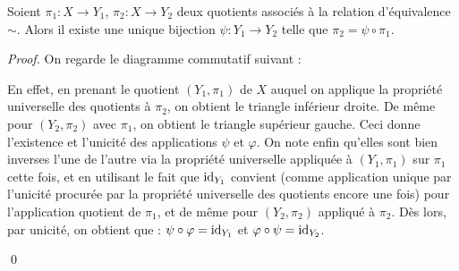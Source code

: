 \begin{corollary}{}
  \label{cor:uniquequotient}
  Soient $\pi _1 :X \to Y_1$, $\pi _2 : X \to Y_2$ deux quotients associés à la relation d'équivalence $\sim$.
  Alors il existe une unique bijection $\psi : Y_1 \to Y_2$ telle que $\pi _2 = \psi \circ \pi _1$.
\end{corollary}
\begin{proof}
    On regarde le diagramme commutatif suivant : 

\begin{center}
    

\end{center}

En effet, en prenant le quotient $(Y_1,\pi _1)$ de $X$ auquel on applique la propriété universelle des
quotients à $\pi _2$, on obtient le triangle inférieur droite. De même pour $(Y_2,\pi _2)$ avec $\pi _1$,
on obtient le triangle supérieur gauche. Ceci donne l'existence et l'unicité des applications $\psi $ et $\varphi$.
On note enfin qu'elles sont bien inverses l'une de l'autre via la propriété universelle appliquée à
$(Y_1,\pi _1)$ sur $\pi _1$ cette fois, et en utilisant le fait que $\textup{id}_{Y_1}$ convient (comme application unique
par l'unicité procurée par la propriété universelle des quotients encore une fois) pour l'application quotient de $\pi _1$,
et de même pour $(Y_2, \pi _2)$ appliqué à $\pi _2$.
Dès lors, par unicité, on obtient que : $\psi \circ \varphi = \textup{id}_{Y_1}$ et $\varphi \circ \psi = \textup{id}_{Y_2}$.

\qed
\end{proof}

